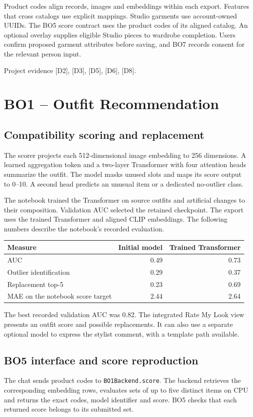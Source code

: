 \documentclass[11pt,a4paper]{article}
\newcommand{\src}[1]{\par{\footnotesize\textcolor{muted}{Project evidence #1.}}\par}
\newcommand{\file}[1]{\nolinkurl{#1}}
\begin{document}
Product codes align records, images and embeddings within each export. Features that cross catalogs use explicit mappings. Studio garments use account-owned UUIDs. The BO5 score contract uses the product codes of its aligned catalog. An optional overlay supplies eligible Studio pieces to wardrobe completion. Users confirm proposed garment attributes before saving, and BO7 records consent for the relevant person input.
\src{[D2], [D3], [D5], [D6], [D8]}

\clearpage
\section{BO1 -- Outfit Recommendation}
\subsection*{Compatibility scoring and replacement}
The scorer projects each 512-dimensional image embedding to 256 dimensions. A learned aggregation token and a two-layer Transformer with four attention heads summarize the outfit. The model masks unused slots and maps its score output to 0--10. A second head predicts an unusual item or a dedicated no-outlier class.

The notebook trained the Transformer on source outfits and artificial changes to their composition. Validation AUC selected the retained checkpoint. The export uses the trained Transformer and aligned CLIP embeddings. The following numbers describe the notebook's recorded evaluation.

\begin{tabularx}{\linewidth}{@{}Yrr@{}}
\toprule
\textbf{Measure} & \textbf{Initial model} & \textbf{Trained Transformer} \\
\midrule
AUC & 0.49 & 0.73 \\
Outlier identification & 0.29 & 0.37 \\
Replacement top-5 & 0.23 & 0.69 \\
MAE on the notebook score target & 2.44 & 2.64 \\
\bottomrule
\end{tabularx}

The best recorded validation AUC was 0.82. The integrated Rate My Look view presents an outfit score and possible replacements. It can also use a separate optional model to express the stylist comment, with a template path available.

\subsection*{BO5 interface and score reproduction}
The chat sends product codes to \file{BO1Backend.score}. The backend retrieves the corresponding embedding rows, evaluates sets of up to five distinct items on CPU and returns the exact codes, model identifier and score. BO5 checks that each returned score belongs to its submitted set.
\end{document}
